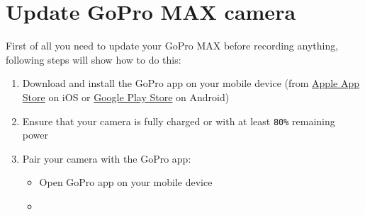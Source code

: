 \documentclass[a4paper,12pt]{book}
\begin{document}
\chapter{Update GoPro MAX camera}
First of all you need to update your GoPro MAX before recording anything, following steps will show how to do this:
\begin{enumerate}
	\item Download and install the GoPro app on your mobile device (from \href{https://apps.apple.com/us/app/gopro-app/id561350520}{Apple App Store} on iOS or \href{https://play.google.com/store/apps/details?id=com.gopro.smarty&hl=en}{Google Play Store} on Android)
	\item Ensure that your camera is fully charged or with at least \verb|80%| remaining power
	\item Pair your camera with the GoPro app:
	\begin{itemize}
		\item Open GoPro app on your mobile device
		\item \begin{minipage}[t]{\linewidth}
			\raggedright
\end{minipage}
\end{itemize}
\end{enumerate}
\end{document}
